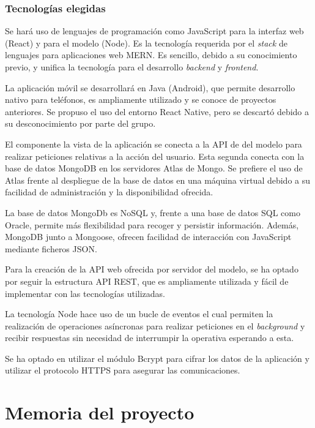 \documentclass{article}
\begin{document}
\subsubsection*{Tecnologías elegidas}

Se hará uso de lenguajes de programación como JavaScript para la interfaz web (React) y para el modelo (Node). Es la tecnología requerida por el \textit{stack} de lenguajes para aplicaciones web MERN. Es sencillo, debido a su conocimiento previo, y unifica la tecnología para el desarrollo \textit{backend} y \textit{frontend}.

La aplicación móvil se desarrollará en Java (Android), que permite desarrollo nativo para teléfonos, es ampliamente utilizado y se conoce de proyectos anteriores. Se propuso el uso del entorno React Native, pero se descartó debido a su desconocimiento por parte del grupo.

El componente la vista de la aplicación se conecta a la API de del modelo para realizar peticiones relativas a la acción del usuario. Esta segunda conecta con la base de datos MongoDB en los servidores Atlas de Mongo. Se prefiere el uso de Atlas frente al despliegue de la base de datos en una máquina virtual debido a su facilidad de administración y la disponibilidad ofrecida. 

\pagebreak

La base de datos MongoDb es NoSQL y, frente a una base de datos SQL como Oracle, permite más flexibilidad para recoger y persistir información. Además, MongoDB junto a Mongoose, ofrecen facilidad de interacción con JavaScript mediante ficheros JSON.

Para la creación de la API web ofrecida por servidor del modelo, se ha optado por seguir la estructura API REST, que es ampliamente utilizada y fácil de implementar con las tecnologías utilizadas. 

La tecnología Node hace uso de un bucle de eventos el cual permiten la realización de operaciones asíncronas para realizar peticiones en el \textit{background} y recibir respuestas sin necesidad de interrumpir la operativa esperando a esta.

Se ha optado en utilizar el módulo Bcrypt para cifrar los datos de la aplicación y utilizar el protocolo HTTPS para asegurar las comunicaciones. 


\section{Memoria del proyecto}
\end{document}
